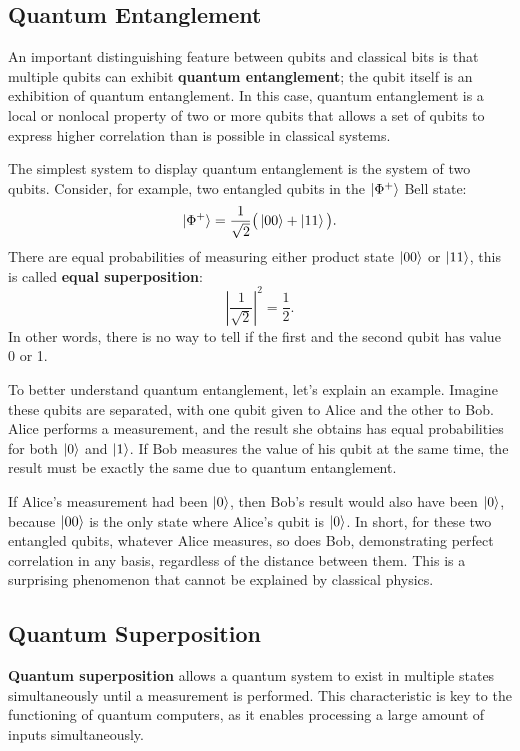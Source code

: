 \subsection{Quantum Entanglement}
An important distinguishing feature between qubits and classical bits is that multiple qubits can exhibit \textbf{quantum entanglement}; the qubit itself is an exhibition of quantum entanglement. In this case, quantum entanglement is a local or nonlocal property of two or more qubits that allows a set of qubits to express higher correlation than is possible in classical systems.

The simplest system to display quantum entanglement is the system of two qubits. Consider, for example, two entangled qubits in the \(\ket{\Phi^+}\) Bell state:
\[
\ket{\Phi^+} = \frac{1}{\sqrt{2}} \big( \ket{00} + \ket{11} \big).
\]
There are equal probabilities of measuring either product state \(\ket{00}\) or \(\ket{11}\), this is called \textbf{equal superposition}:
\[
\left| \frac{1}{\sqrt{2}} \right|^2 = \frac{1}{2}.
\]
In other words, there is no way to tell if the first and the second qubit has value 0 or 1.

To better understand quantum entanglement, let's explain an example. Imagine these qubits are separated, with one qubit given to Alice and the other to Bob. Alice performs a measurement, and the result she obtains has equal probabilities for both \(\ket{0}\) and \(\ket{1}\). If Bob measures the value of his qubit at the same time, the result must be exactly the same due to quantum entanglement.

If Alice's measurement had been \(\ket{0}\), then Bob's result would also have been \(\ket{0}\), because \(\ket{00}\) is the only state where Alice's qubit is \(\ket{0}\). In short, for these two entangled qubits, whatever Alice measures, so does Bob, demonstrating perfect correlation in any basis, regardless of the distance between them. This is a surprising phenomenon that cannot be explained by classical physics.\cite{pirandola2015advances}


\subsection{Quantum Superposition}

\textbf{Quantum superposition} allows a quantum system to exist in multiple states simultaneously until a measurement is performed. This characteristic is key to the functioning of quantum computers, as it enables processing a large amount of inputs simultaneously.

